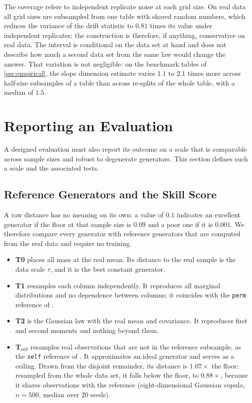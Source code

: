 \documentclass[twoside,11pt]{article}
\theoremstyle{plain}
\theoremstyle{definition}
\theoremstyle{remark}
\begin{document}
The coverage refers to independent replicate noise at each grid size. On
real data all grid sizes are subsampled from one table with shared random
numbers, which reduces the variance of the drift statistic to $0.81$ times
its value under independent replicates; the construction is therefore, if
anything, conservative on real data. The interval is conditional on the data
set at hand and does not describe how much a second data set from the same
law would change the answer. That variation is not negligible: on the
benchmark tables of \cref{sec:empirical}, the slope dimension estimate varies
$1.1$ to $2.1$ times more across half-size subsamples of a table than across
re-splits of the whole table, with a median of $1.5$.

\section{Reporting an Evaluation}\label{sec:reporting}

A designed evaluation must also report its outcome on a scale that is
comparable across sample sizes and robust to degenerate generators. This
section defines such a scale and the associated tests.

\subsection{Reference Generators and the Skill Score}\label{sec:reporting-hierarchy}

A raw distance has no meaning on its own: a value of $0.1$ indicates an
excellent generator if the floor at that sample size is $0.09$ and a poor
one if it is $0.001$. We therefore compare every generator with reference
generators that are computed from the real data and require no training.
\begin{itemize}
\item \textbf{T0} places all mass at the real mean. Its distance to the
  real sample is the data scale $\tau$, and it is the best constant
  generator.
\item \textbf{T1} resamples each column independently. It reproduces all
  marginal distributions and no dependence between columns; it coincides
  with the \texttt{perm} reference of \citet{yang2024}.
\item \textbf{T2} is the Gaussian law with the real mean and covariance. It
  reproduces first and second moments and nothing beyond them.
\item \textbf{T$_{\mathrm{self}}$} resamples real observations that are not
  in the reference subsample, as the \texttt{self} reference of
  \citet{yang2024}. It approximates an ideal generator and serves as a
  ceiling. Drawn from the disjoint remainder, its distance is $1.07\times$ the floor; resampled from the whole data set, it falls below the floor, to $0.88\times$, because it shares observations with the reference (eight-dimensional Gaussian copula, $n = 500$, median over $20$ seeds).
\end{itemize}
\end{document}
